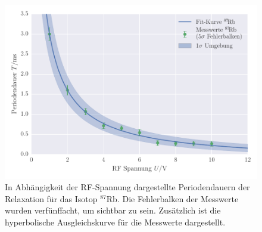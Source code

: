 \FloatBarrier
\begin{figure}[!h]
\centering
\includegraphics[scale=.85]{../Grafiken/Transienteneffekt_Rubidium_87.pdf}
\caption{In Abhängigkeit der RF-Spannung dargestellte Periodendauern der Relaxation
	für das Isotop ${}^{87}\!$Rb. Die Fehlerbalken der Messwerte wurden verfünffacht, 
	um sichtbar zu sein. Zusätzlich ist die hyperbolische Ausgleichskurve für die Messwerte
	dargestellt. \label{fig:transienteneffekt_rubidium_87}}
\end{figure}
\FloatBarrier